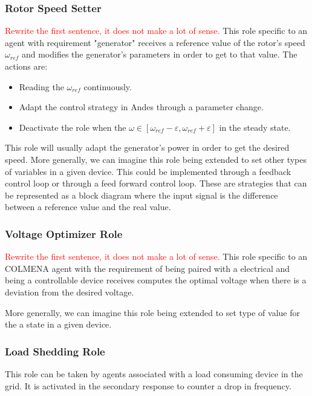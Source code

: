 \documentclass{article}
\begin{document}
\subsubsection*{Rotor Speed Setter}

\textcolor{red}{Rewrite the first sentence, it does not make a lot of sense.}
This role specific to an agent with requirement "generator" receives a reference value of the rotor's speed $\omega_{ref}$ and modifies the generator's parameters in order to get to that value. The actions are:

\begin{itemize}
    \item Reading the $\omega_{ref}$ continuously.
    \item Adapt the control strategy in Andes through a parameter change.
    \item Deactivate the role when the $\omega \in [\omega_{ref} - \varepsilon, \omega_{ref} + \varepsilon]$ in the steady state.
\end{itemize}

This role will usually adapt the generator's power in order to get the desired speed. More generally, we can imagine this role being extended to set other types of variables in a given device. This could be implemented through a feedback control loop or through a feed forward control loop. These are strategies that can be represented as a block diagram where the input signal is the difference between a reference value and the real value. 

\subsubsection*{Voltage Optimizer Role}

\textcolor{red}{Rewrite the first sentence, it does not make a lot of sense.}
This role specific to an COLMENA agent with the requirement of being paired with a electrical and being a controllable device receives computes the optimal voltage when there is a deviation from the desired voltage.

More generally, we can imagine this role being extended to set type of value for the a state in a given device. 
\subsubsection*{Load Shedding Role}

This role can be taken by agents associated with a load consuming device in the grid. It is activated in the secondary response to counter a drop in frequency.
\end{document}
